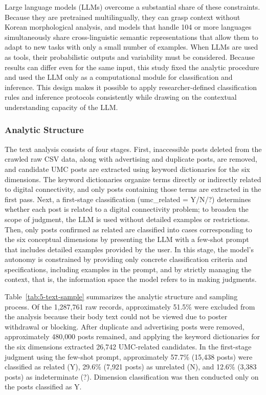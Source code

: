 Large language models (LLMs) overcome a substantial share of these constraints. Because they are pretrained multilingually, they can grasp context without Korean morphological analysis, and models that handle 104 or more languages simultaneously share cross-linguistic semantic representations that allow them to adapt to new tasks with only a small number of examples. When LLMs are used as tools, their probabilistic outputs and variability must be considered. Because results can differ even for the same input, this study fixed the analytic procedure and used the LLM only as a computational module for classification and inference. This design makes it possible to apply researcher-defined classification rules and inference protocols consistently while drawing on the contextual understanding capacity of the LLM.

\subsubsection{Analytic Structure}
\label{subsubsec:3-3-3}

The text analysis consists of four stages. First, inaccessible posts deleted from the crawled raw CSV data, along with advertising and duplicate posts, are removed, and candidate UMC posts are extracted using keyword dictionaries for the six dimensions. The keyword dictionaries organize terms directly or indirectly related to digital connectivity, and only posts containing those terms are extracted in the first pass. Next, a first-stage classification (umc\_related = Y/N/?) determines whether each post is related to a digital connectivity problem; to broaden the scope of judgment, the LLM is used without detailed examples or restrictions. Then, only posts confirmed as related are classified into cases corresponding to the six conceptual dimensions by presenting the LLM with a few-shot prompt that includes detailed examples provided by the user. In this stage, the model's autonomy is constrained by providing only concrete classification criteria and specifications, including examples in the prompt, and by strictly managing the context, that is, the information space the model refers to in making judgments.

Table~\ref{tab:5-text-sample} summarizes the analytic structure and sampling process. Of the 1{,}287{,}761 raw records, approximately 51.5\% were excluded from the analysis because their body text could not be viewed due to poster withdrawal or blocking. After duplicate and advertising posts were removed, approximately 480{,}000 posts remained, and applying the keyword dictionaries for the six dimensions extracted 26{,}742 UMC-related candidates. In the first-stage judgment using the few-shot prompt, approximately 57.7\% (15{,}438 posts) were classified as related (Y), 29.6\% (7{,}921 posts) as unrelated (N), and 12.6\% (3{,}383 posts) as indeterminate (?). Dimension classification was then conducted only on the posts classified as Y.

